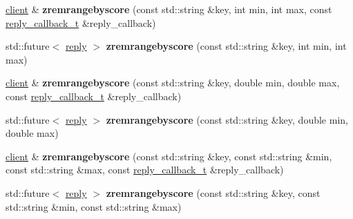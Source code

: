 \begin{DoxyCompactItemize}
\item 
\mbox{\label{classcpp__redis_1_1client_a8de95c0d340cc58d81fe5ca9b576d5b8}} 
\mbox{\hyperlink{classcpp__redis_1_1client}{client}} \& {\bfseries zremrangebyscore} (const std\+::string \&key, int min, int max, const \mbox{\hyperlink{classcpp__redis_1_1client_af7a65eb21aa25230bfbb0b0203c4fc04}{reply\+\_\+callback\+\_\+t}} \&reply\+\_\+callback)
\item 
\mbox{\label{classcpp__redis_1_1client_a1317e67f2993b71bce596d28bce009b9}} 
std\+::future$<$ \mbox{\hyperlink{classcpp__redis_1_1reply}{reply}} $>$ {\bfseries zremrangebyscore} (const std\+::string \&key, int min, int max)
\item 
\mbox{\label{classcpp__redis_1_1client_a62354f918bcc9fd99562f1fe25dadec7}} 
\mbox{\hyperlink{classcpp__redis_1_1client}{client}} \& {\bfseries zremrangebyscore} (const std\+::string \&key, double min, double max, const \mbox{\hyperlink{classcpp__redis_1_1client_af7a65eb21aa25230bfbb0b0203c4fc04}{reply\+\_\+callback\+\_\+t}} \&reply\+\_\+callback)
\item 
\mbox{\label{classcpp__redis_1_1client_ab40737e3dd44d39d708ab9e545f1d068}} 
std\+::future$<$ \mbox{\hyperlink{classcpp__redis_1_1reply}{reply}} $>$ {\bfseries zremrangebyscore} (const std\+::string \&key, double min, double max)
\item 
\mbox{\label{classcpp__redis_1_1client_a4a9c526f56dc158345f359961c9f9a7d}} 
\mbox{\hyperlink{classcpp__redis_1_1client}{client}} \& {\bfseries zremrangebyscore} (const std\+::string \&key, const std\+::string \&min, const std\+::string \&max, const \mbox{\hyperlink{classcpp__redis_1_1client_af7a65eb21aa25230bfbb0b0203c4fc04}{reply\+\_\+callback\+\_\+t}} \&reply\+\_\+callback)
\item 
\mbox{\label{classcpp__redis_1_1client_afdef5244240e2c54c9738be66807e8f6}} 
std\+::future$<$ \mbox{\hyperlink{classcpp__redis_1_1reply}{reply}} $>$ {\bfseries zremrangebyscore} (const std\+::string \&key, const std\+::string \&min, const std\+::string \&max)
\item 
\mbox{\label{classcpp__redis_1_1client_ad408a62269d10de02605de9acec1ddc0}} 

\end{DoxyCompactItemize}
